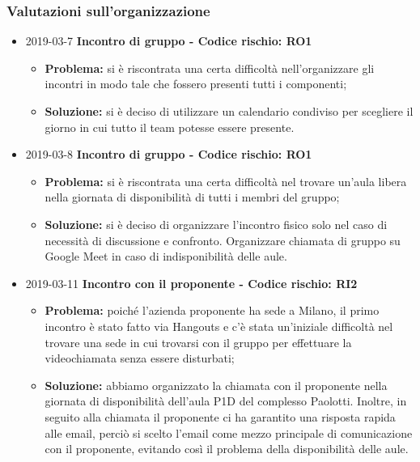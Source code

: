 \subsubsection{Valutazioni sull'organizzazione}
\begin{itemize}	
		
		\item 2019-03-7 \textbf{Incontro di gruppo - Codice rischio: RO1} \\
		\begin{itemize}
			\item \textbf{Problema:} si è riscontrata una certa difficoltà 				nell'organizzare gli incontri in modo tale che fossero presenti tutti i componenti;
			\item \textbf{Soluzione:} si è deciso di utilizzare un calendario condiviso per scegliere il giorno
		in cui tutto il team potesse essere presente. 
		\end{itemize}
		
		\item 2019-03-8 \textbf{Incontro di gruppo - Codice rischio: RO1} \\
		\begin{itemize}
			\item \textbf{Problema:} si è riscontrata una certa difficoltà nel trovare un'aula libera nella giornata di disponibilità di tutti i membri del gruppo;
			\item \textbf{Soluzione:} si è deciso di organizzare l'incontro fisico solo nel caso di necessità di discussione e confronto. Organizzare chiamata di gruppo su Google Meet in caso di indisponibilità delle aule. 
		\end{itemize}
						
						
		\item 2019-03-11 \textbf{Incontro con il proponente - Codice rischio: RI2} \\
		\begin{itemize}
			\item \textbf{Problema:} poiché l'azienda proponente ha sede a Milano, il primo incontro è stato fatto
		via Hangouts e c'è stata un'iniziale difficoltà nel trovare una sede in cui 
		trovarsi con il gruppo per effettuare la videochiamata senza essere disturbati;
			\item \textbf{Soluzione:} abbiamo organizzato la chiamata con il proponente nella giornata di disponibilità dell'aula P1D del complesso Paolotti. Inoltre, in seguito alla chiamata il proponente ci ha garantito una risposta rapida alle email, perciò si scelto l'email come mezzo principale di comunicazione con il proponente, evitando così il problema della disponibilità delle aule.
		\end{itemize}
		

\end{itemize}
